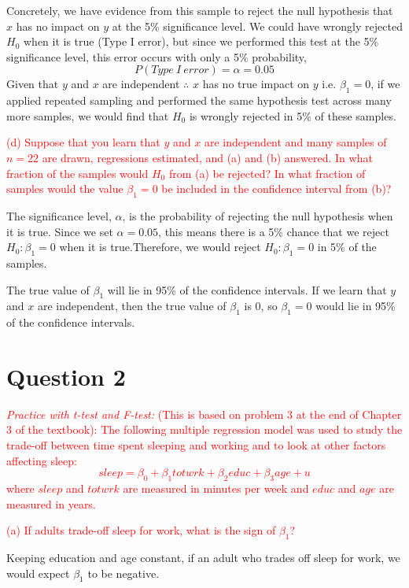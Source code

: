 \documentclass[12pt]{report}
\begin{document}
\noindent Concretely, we have evidence from this sample to reject the null hypothesis that $x$ has no impact on $y$ at the 5\% significance level. We could have wrongly rejected $H_0$ when it is true (Type I error), but since we performed this test at the 5\% significance level, this error occurs with only a 5\% probability, $$P(Type\ I\ error) = \alpha = 0.05$$ Given that $y$ and $x$ are independent $\therefore$ $x$ has no true impact on $y$ i.e. $\beta_1 = 0$, if we applied repeated sampling and performed the same hypothesis test across many more samples, we would find that $H_0$ is wrongly rejected in 5\% of these samples.

\noindent \textcolor{red}{(d) Suppose that you learn that $y$ and $x$ are independent and many samples of $n=22$ are drawn, regressions estimated, and (a) and (b) answered. In what fraction of the samples would $H_0$ from (a) be rejected? In what fraction of samples would the value $\beta_1 = 0$ be included in the confidence interval from (b)?}

\noindent The significance level, $\alpha$, is the probability of rejecting the null hypothesis when it is true. Since we set $\alpha = 0.05$, this means there is a 5\% chance that we reject $H_0: \beta_1=0$ when it is true.Therefore, we would reject $H_0: \beta_1=0$ in 5\% of the samples.

\noindent The true value of $\beta_1$ will lie in 95\% of the confidence intervals. If we learn that $y$ and $x$ are independent, then the true value of $\beta_1$ is $0$, so $\beta_1 = 0$ would lie in 95\% of the confidence intervals.

\newpage
\section*{Question 2}
\noindent \textcolor{red}{\textit{Practice with t-test and F-test:} (This is based on problem 3 at the end of Chapter 3 of the textbook): The following multiple regression model was used to study the trade-off between time spent sleeping and working and to look at other factors affecting sleep: $$sleep = \beta_0 + \beta_1 totwrk + \beta_2 educ + \beta_3 age + u$$ where $sleep$ and $totwrk$ are measured in minutes per week and $educ$ and $age$ are measured in years.}

\noindent \textcolor{red}{(a) If adults trade-off sleep for work, what is the sign of $\beta_1$?}

\noindent Keeping education and age constant, if an adult who trades off sleep for work, we would expect $\beta_1$ to be negative.
\end{document}
